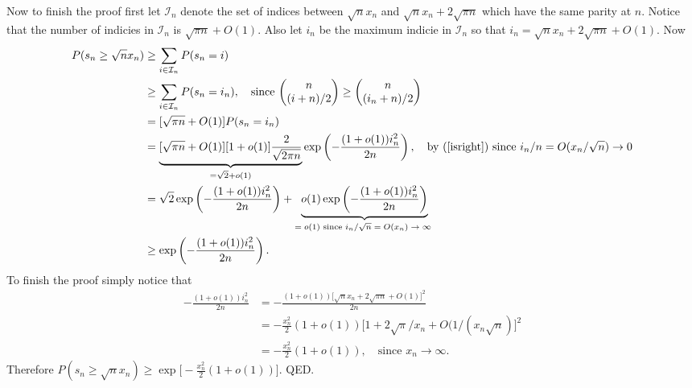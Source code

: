 \documentclass[11pt,letterpaper]{article}
\begin{document}
Now to finish the proof first let $\mathcal I_n$ denote the set of indices between $\sqrt{n}x_n$ and $\sqrt{n}x_n + 2\sqrt{\pi n}$ which have the same parity at $n$. Notice that the number of indicies in $\mathcal I_n$ is $\sqrt{\pi  n}+ O(1)$.  Also let $i_n$ be the maximum indicie in $\mathcal I_n$ so that $i_n = \sqrt{n}x_n + 2\sqrt{\pi n} + O(1)$. Now
\begin{align*}
P(s_n\geq \sqrt{n} x_n)&\geq \sum_{i\in\mathcal I_n} P(s_n = i)\\
&\geq \sum_{i\in\mathcal I_n} P(s_n = i_n),\quad \text{since $\begin{pmatrix} n \\ (i +n)/2 \end{pmatrix}\geq \begin{pmatrix} n \\ (i_n +n)/2 \end{pmatrix}$}\\
&= [\sqrt{\pi n}+ O(1)]P(s_n = i_n)\\
&=\underbrace{ [\sqrt{\pi n}+ O(1)][1+o(1)]\frac{2}{\sqrt{2\pi n}} }_{ = \sqrt 2 +o(1)} \exp\left( - \frac{(1+o(1)) i_n^2}{2n} \right),\quad \text{by (\ref{isright}) since $i_n/n= O(x_n/\sqrt{n}) \rightarrow 0$} \\
&= \sqrt{2} \exp\left( - \frac{(1+o(1)) i_n^2}{2n} \right) + \underbrace{ o(1)\exp\left( - \frac{(1+o(1)) i_n^2}{2n} \right)}_\text{$=o(1)$ since $i_n/\sqrt{n}=O(x_n)\rightarrow \infty$  }\\
&\geq \exp\left( - \frac{(1+o(1)) i_n^2}{2n} \right).
\end{align*}
To finish the proof simply notice that 
\begin{align*}
- \frac{(1+o(1)) i_n^2}{2n} & = - \frac{(1+o(1)) \bigl[\sqrt{n}x_n +2\sqrt{\pi n} + O(1) \bigr]^2}{2n} \\
& = - \frac{x_n^2}{2} (1+o(1)) \bigl[1 + 2\sqrt{\pi}/x_n + O(1/(x_n\sqrt{n}) \bigr]^2 \\
& = - \frac{x_n^2}{2} (1+o(1)) ,\quad\text{since $x_n\rightarrow \infty$}.
\end{align*}
Therefore $P(s_n\geq \sqrt{n} x_n) \geq \exp\bigl[ - \frac{x_n^2}{2} (1+o(1))  \Bigr]$.
QED.

\newpage
\end{document}
